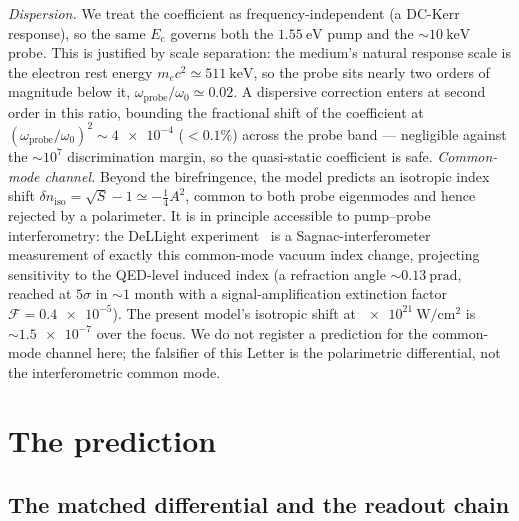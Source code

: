 \documentclass[aps,prd,twocolumn,superscriptaddress,nofootinbib,longbibliography]{revtex4-2}
\newcommand{\Ec}{E_{\mathrm{c}}}
\begin{document}
\emph{Dispersion.} We treat the coefficient as frequency-independent (a DC-Kerr
response), so the same $\Ec$ governs both the $\SI{1.55}{\electronvolt}$ pump and
the $\sim\SI{10}{\kilo\electronvolt}$ probe. This is justified by scale
separation: the medium's natural response scale is the electron rest energy
$m_ec^2\simeq\SI{511}{\kilo\electronvolt}$, so the probe sits nearly two orders of
magnitude below it, $\omega_{\mathrm{probe}}/\omega_0\simeq0.02$. A dispersive
correction enters at second order in this ratio, bounding the fractional shift of
the coefficient at $(\omega_{\mathrm{probe}}/\omega_0)^2\sim\num{4e-4}$ ($<0.1\%$)
across the probe band --- negligible against the $\sim\!10^7$ discrimination margin,
so the quasi-static coefficient is safe. \emph{Common-mode
channel.} Beyond the birefringence, the model predicts an isotropic index shift
$\delta n_{\mathrm{iso}}=\sqrt{S}-1\simeq-\tfrac14 A^2$, common to both probe
eigenmodes and hence rejected by a polarimeter. It is in principle accessible to
pump--probe interferometry: the DeLLight experiment~\cite{Robertson2021DeLLight}
is a Sagnac-interferometer measurement of exactly this common-mode vacuum index
change, projecting sensitivity to the QED-level induced index (a refraction angle
$\sim\!\SI{0.13}{\pico\radian}$, reached at $5\sigma$ in $\sim\!1$ month with a
signal-amplification extinction factor $\mathcal F=\num{0.4e-5}$). The present
model's isotropic shift at $\SI{e21}{\watt\per\centi\meter\squared}$ is
$\sim\!\num{1.5e-7}$ over the focus. We do not register a prediction for the
common-mode channel here; the falsifier of this Letter is the polarimetric
differential, not the interferometric common mode.

\section{The prediction}
\label{sec:prediction}

\subsection{The matched differential and the readout chain}
\end{document}
